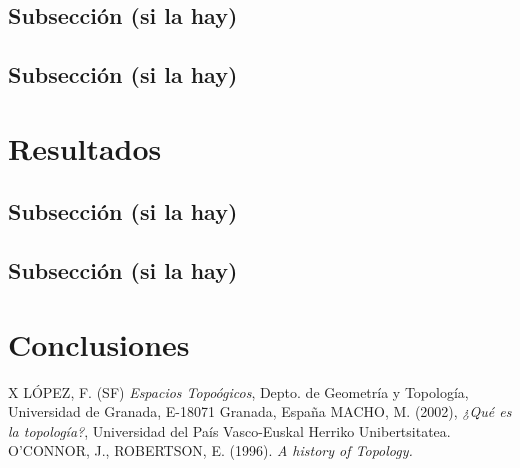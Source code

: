 \documentclass[12pt, twoside]{article} %
\begin{document}
\subsection{Subsección (si la hay)}
\lipsum %
\subsection{Subsección (si la hay)}
\lipsum %

\newpage
\section{Resultados}
\lipsum[1] %
\subsection{Subsección (si la hay)}
\lipsum %
\subsection{Subsección (si la hay)}
\lipsum %

\newpage
\section{Conclusiones}
\lipsum[5] %
\lipsum[1] %

\newpage

\begin{thebibliography}{X} %
 LÓPEZ, F. (SF) \textit{Espacios Topoógicos}, Depto. de Geometría y Topología, Universidad de Granada, E-18071 Granada, España
 MACHO, M. (2002), \textit{¿Qué es la topología?}, Universidad del País Vasco-Euskal Herriko Unibertsitatea.
 O’CONNOR, J., ROBERTSON, E. (1996). \textit{A history of Topology.}
\end{thebibliography}
\end{document}
